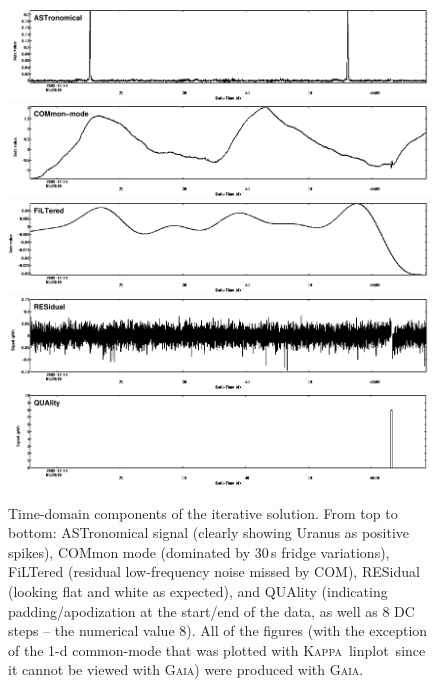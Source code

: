 \documentclass[twoside,11pt]{article}
\newcommand{\Kappa}{\xref{\textsc{Kappa}}{sun95}{}}
\newcommand{\gaia}{\xref{\textsc{Gaia}}{sun214}{}}
\newcommand{\task}[1]{\textsf{#1}}
\newcommand{\linplot}{\xref{\task{linplot}}{sun95}{LINPLOT}}
\newcommand{\xref}[3]{#1}
\renewcommand{\_}{\texttt{\symbol{95}}}
\begin{document}
\begin{figure}
\begin{center}
\includegraphics[width=\linewidth]{sc19_iter_ast} \\
\includegraphics[width=\linewidth]{sc19_iter_com} \\
\includegraphics[width=\linewidth]{sc19_iter_flt} \\
\includegraphics[width=\linewidth]{sc19_iter_res} \\
\includegraphics[width=\linewidth]{sc19_iter_qua} \\
\caption{Time-domain components of the iterative solution. From top to
  bottom: ASTronomical signal (clearly showing Uranus as positive
  spikes), COMmon mode (dominated by 30\,s fridge variations),
  FiLTered (residual low-frequency noise missed by COM), RESidual
  (looking flat and white as expected), and QUAlity (indicating
  padding/apodization at the start/end of the data, as well as 8 DC
  steps -- the numerical value 8). All of the figures (with the
  exception of the 1-d common-mode that was plotted with \Kappa\
  \linplot\ since it cannot be viewed with \gaia) were produced with
  \gaia.}
\label{fig:itercomp}
\end{center}
\end{figure}
\end{document}
